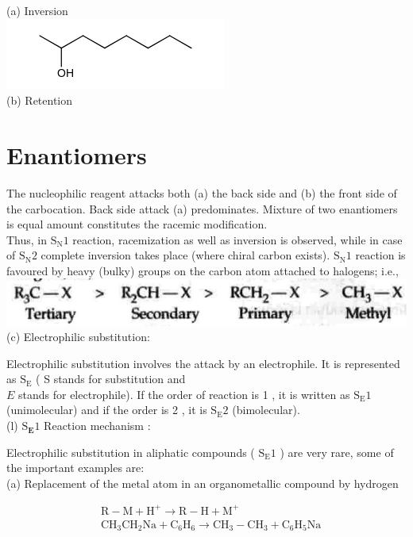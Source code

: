 \documentclass[10pt]{article}
\begin{document}
(a) Inversion\\
\includegraphics{smile-53003bab46409a24bb6f5d1ba2a7edc08ec65083}\\
(b) Retention

\section*{Enantiomers}
The nucleophilic reagent attacks both (a) the back side and (b) the front side of the carbocation. Back side attack (a) predominates. Mixture of two enantiomers is equal amount constitutes the racemic modification.\\
Thus, in $\mathrm{S}_{\mathrm{N}} 1$ reaction, racemization as well as inversion is observed, while in case of $\mathrm{S}_{\mathrm{N}} 2$ complete inversion takes place (where chiral carbon exists). $\mathrm{S}_{\mathrm{N}} 1$ reaction is favoured by heavy (bulky) groups on the carbon atom attached to halogens; i.e.,\\
\includegraphics[max width=\textwidth, center]{2025_01_28_8470952b98110cec3aabg-093}\\
(c) Electrophilic substitution:

Electrophilic substitution involves the attack by an electrophile. It is represented as $\mathrm{S}_{\mathrm{E}}$ ( S stands for substitution and\\
$E$ stands for electrophile). If the order of reaction is 1 , it is written as $\mathrm{S}_{\mathrm{E}} 1$ (unimolecular) and if the order is 2 , it is $\mathrm{S}_{\mathrm{E}} 2$ (bimolecular).\\
(l) $\mathrm{S}_{\mathbf{E}} 1$ Reaction mechanism :

Electrophilic substitution in aliphatic compounds ( $\mathrm{S}_{\mathrm{E}} 1$ ) are very rare, some of the important examples are:\\
(a) Replacement of the metal atom in an organometallic compound by hydrogen

$$
\begin{aligned}
& \mathrm{R}-\mathrm{M}+\mathrm{H}^{+} \longrightarrow \mathrm{R}-\mathrm{H}+\mathrm{M}^{+} \\
& \mathrm{CH}_{3} \mathrm{CH}_{2} \mathrm{Na}+\mathrm{C}_{6} \mathrm{H}_{6} \longrightarrow \mathrm{CH}_{3}-\mathrm{CH}_{3}+\mathrm{C}_{6} \mathrm{H}_{5} \mathrm{Na}
\end{aligned}
$$
\end{document}
